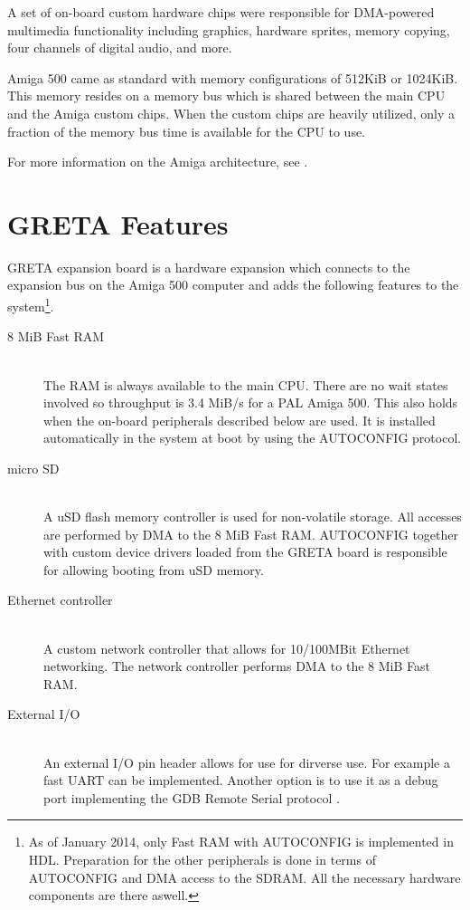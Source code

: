 \documentclass[a4paper]{report}
\begin{document}
A set of on-board custom hardware chips were responsible
for DMA-powered multimedia functionality including graphics,
hardware sprites, memory copying, four channels of digital
audio, and more.

Amiga 500 came as standard with memory configurations of
512KiB or 1024KiB. This memory resides on a memory bus which is
shared between the main CPU and the Amiga custom chips. When
the custom chips are heavily utilized, only a fraction of the
memory bus time is available for the CPU to use.

For more information on the Amiga architecture, see
\cite{a500_techref}.

\section{GRETA Features}
GRETA expansion board is a hardware expansion which connects
to the expansion bus on the Amiga 500 computer and adds the
following features to the system\footnote{As of January 2014,
only Fast RAM with AUTOCONFIG is implemented in HDL. Preparation
for the other peripherals is done in terms of AUTOCONFIG and
DMA access to the SDRAM. All the necessary hardware components
are there aswell.}.

\begin{description}
  \item[8 MiB Fast RAM] \hfill \\
    The RAM is always available to the main CPU. There are no
    wait states involved so throughput is 3.4 MiB/s for a PAL
    Amiga 500. This also holds when the on-board peripherals described
    below are used. It is installed automatically in the system
    at boot by using the AUTOCONFIG protocol.

  \item[micro SD] \hfill \\
    A uSD flash memory controller is used for non-volatile
    storage. All accesses are performed by DMA to the 8 MiB
    Fast RAM.  AUTOCONFIG together with custom device drivers
    loaded from the GRETA board is responsible for allowing
    booting from uSD memory.

  \item[Ethernet controller] \hfill \\
    A custom network controller that allows for 10/100MBit Ethernet networking. The network controller performs DMA to the 8 MiB Fast RAM.

  \item[External I/O] \hfill \\
    An external I/O pin header allows for use for dirverse use. For example a fast UART can be implemented. Another option is to use it as
    a debug port implementing the GDB Remote Serial protocol \cite{gdbserial}.

\end{description}
\end{document}
